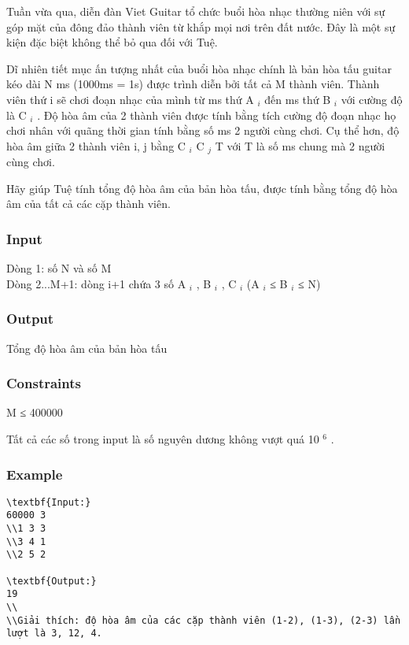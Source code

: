 



   Tuần vừa qua, diễn đàn Viet Guitar tổ chức buổi hòa nhạc thường niên với sự góp mặt của đông đảo thành viên từ khắp mọi nơi trên đất nước. Đây là một sự kiện đặc biệt không thể bỏ qua đối với Tuệ.  

   Dĩ nhiên tiết mục ấn tượng nhất của buổi hòa nhạc chính là bản hòa tấu guitar kéo dài N ms (1000ms = 1s) được trình diễn bởi tất cả M thành viên. Thành viên thứ i sẽ chơi đoạn nhạc của mình từ ms thứ A   $_    i   $   đến ms thứ B   $_    i   $   với cường độ là C   $_    i   $   . Độ hòa âm của 2 thành viên được tính bằng tích cường độ đoạn nhạc họ chơi nhân với quãng thời gian tính bằng số ms 2 người cùng chơi. Cụ thể hơn, độ hòa âm giữa 2 thành viên i, j bằng C   $_    i   $   C   $_    j   $   T với T là số ms chung mà 2 người cùng chơi.  

   Hãy giúp Tuệ tính tổng độ hòa âm của bản hòa tấu, được tính bằng tổng độ hòa âm của tất cả các cặp thành viên.  

\subsubsection{   Input  }

   Dòng 1: số N và số M   
\\   Dòng 2...M+1: dòng i+1 chứa 3 số A   $_    i   $   , B   $_    i   $   , C   $_    i   $   (A   $_    i   $   ≤ B   $_    i   $   ≤ N)  

\subsubsection{   Output  }

   Tổng độ hòa âm của bản hòa tấu  

\subsubsection{   Constraints  }

   M ≤ 400000  

   Tất cả các số trong input là số nguyên dương không vượt quá 10   $^    6   $   .  

\subsubsection{   Example  }
\begin{verbatim}
\textbf{Input:}
60000 3
\\1 3 3
\\3 4 1
\\2 5 2

\textbf{Output:}
19
\\
\\Giải thích: độ hòa âm của các cặp thành viên (1-2), (1-3), (2-3) lần lượt là 3, 12, 4. \end{verbatim}